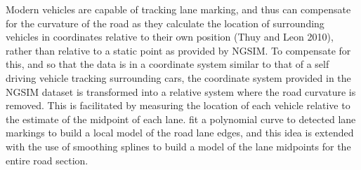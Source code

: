 \documentclass[12pt,a4paper]{article}\usepackage[]{graphicx}\usepackage[]{color}
\begin{document}
Modern vehicles are capable of tracking lane marking, and thus can compensate for the curvature of the road as they calculate the location of surrounding vehicles in coordinates relative to their own position (Thuy and Leon 2010), rather than relative to a static point as provided by NGSIM. To compensate for this, and so that the data is in a coordinate system similar to that of a self driving vehicle tracking surrounding cars, the coordinate system provided in the NGSIM dataset is transformed into a relative system where the road curvature is removed. This is facilitated by measuring the location of each vehicle relative to the estimate of the midpoint of each lane. \citet{Woo2016a} fit a polynomial curve to detected lane markings to build a local model of the road lane edges, and this idea is extended with the use of smoothing splines to build a model of the lane midpoints for the entire road section. 
\end{document}
